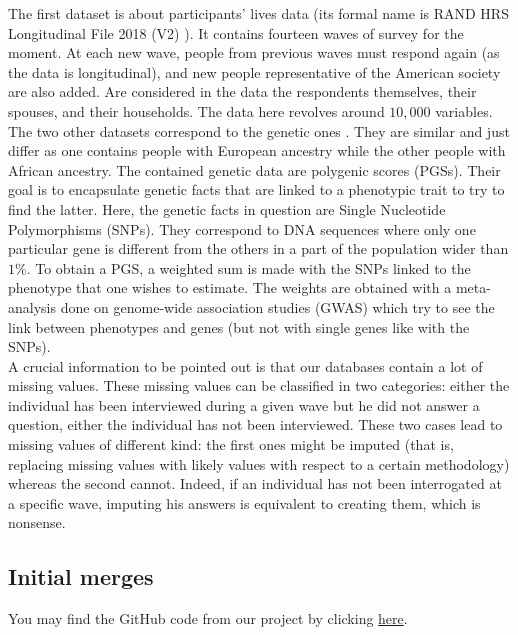 \documentclass[]{article}
\begin{document}
\noindent
The first dataset is about participants’ lives data (its formal name is RAND HRS Longitudinal File 2018 (V2) \cite{hrs2014}). It contains fourteen waves of survey for the moment. At each new wave, people from previous waves must respond again (as the data is longitudinal), and new people representative of the American society are also added. Are considered in the data the respondents themselves, their spouses, and their households. The data here revolves around $10,000$ variables.\\

\noindent
The two other datasets correspond to the genetic ones \cite{genetic2021}. They are similar and just differ as one contains people with European ancestry while the other people with African ancestry. The contained genetic data are polygenic scores (PGSs). Their goal is to encapsulate genetic facts that are linked to a phenotypic trait to try to find the latter. Here, the genetic facts in question are Single Nucleotide Polymorphisms (SNPs). They correspond to DNA sequences where only one particular gene is different from the others in a part of the population wider than $1$\%. To obtain a PGS, a weighted sum is made with the SNPs linked to the phenotype that one wishes to estimate. The weights are obtained with a meta-analysis done on genome-wide association studies (GWAS) which try to see the link between phenotypes and genes (but not with single genes like with the SNPs).\\

\noindent
A crucial information to be pointed out is that our databases contain a lot of missing values. These missing values can be classified in two categories: either the individual has been interviewed during a given wave but he did not answer a question, either the individual has not been interviewed. These two cases lead to missing values of different kind: the first ones might be imputed (that is, replacing missing values with likely values with respect to a certain methodology) whereas the second cannot. Indeed, if an individual has not been interrogated at a specific wave, imputing his answers is equivalent to creating them, which is nonsense.

\subsection{Initial merges}

You may find the GitHub code from our project by clicking \href{https://github.com/jveillon/Projet_Statapp.git}{here}. \\
\end{document}
